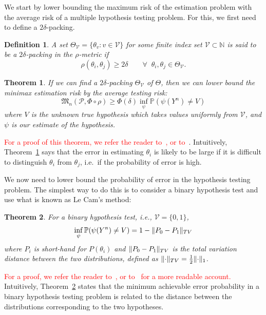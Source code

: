 \documentclass[conference,letterpaper]{IEEEtran}
\DeclarePairedDelimiter\norm{\lVert}{\rVert}
\newcommand{\Phiorho}{\Phi\!\circ\!\rho}
\newtheorem{theorem}{Theorem}
\newtheorem{definition}{Definition}
\begin{document}
We start by lower bounding the maximum risk of the estimation problem with the
average risk of a multiple hypothesis testing problem. For this, we first need
to define a $2\delta$-packing.%
\begin{definition}
	A set $\Theta_{\mathcal{V}} = \{ \theta_v : v \in \mathcal{V} \}$ for some
	finite index set $\mathcal{V} \subset \mathbb N$ is said to be a
	$2\delta$-packing in the $\rho$-metric if
	\begin{equation}
		\rho(\theta_i, \theta_j) \geq 2\delta \qquad \forall \;\; \theta_i, \theta_j \in \Theta_{\mathcal{V}}.
	\end{equation}
\end{definition}
\begin{theorem} \label{thm:est-to-testing}%
	If we can find a $2\delta$-packing $\Theta_{\mathcal{V}}$ of $\Theta$, then
	we can lower bound the minimax estimation risk by the average testing risk:
	\begin{equation}
		\mathfrak{M}_n(\mathcal{P}, \Phiorho) \geq \Phi(\delta) \inf_\psi \mathbb P (\psi(Y^n) \neq V)
	\end{equation}
	where $V$ is the unknown true hypothesis which takes values uniformly from
	$\mathcal{V}$, and $\psi$ is our estimate of the hypothesis.
\end{theorem}
\textcolor{red}{For a proof of this theorem, we refer the reader
to~\cite[Sec.~2.2]{Tsybakov2009Introduction}, or
to~\cite[Prop.~13.3]{Duchi2015Information}}. Intuitively,
Theorem~\ref{thm:est-to-testing} says that the error in estimating $\theta_i$
is likely to be large if it is difficult to distinguish $\theta_i$ from
$\theta_j$, i.e.\ if the probability of error is high.

We now need to lower bound the probability of error in the hypothesis testing
problem. The simplest way to do this is to consider a binary hypothesis test
and use what is known as Le Cam's method:
\begin{theorem} \label{thm:le-cam}
	For a binary hypothesis test, i.e., $\mathcal{V} = \{0, 1\}$,
	\begin{equation}
		\inf_\psi \mathbb P(\psi(Y^n) \neq V) = 1 - \norm{P_0 - P_1}_{TV}
	\end{equation}
	where $P_i$ is short-hand for $P(\theta_i)$ and $\norm{P_0 - P_1}_{TV}$ is
	the total variation distance between the two distributions, defined as
	$\norm{\cdot}_{TV} = \frac{1}{2} \norm{\cdot}_1$.
\end{theorem}
\textcolor{red}{For a proof, we refer the reader to~\cite[Thm.~2.2]{Tsybakov2009Introduction},
or to~\cite[Prop.~2.11]{Duchi2015Information} for a more readable account.}
Intuitively, Theorem~\ref{thm:le-cam} states that the minimum achievable error
probability in a binary hypothesis testing problem is related to the distance
between the distributions corresponding to the two hypotheses.
\end{document}
